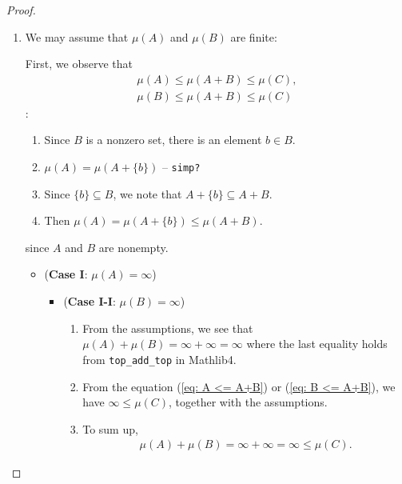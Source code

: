 \begin{proof}
    \begin{enumerate}
        \item We may assume that \(\mu(A)\) and \(\mu(B)\) are finite:

        First, we observe that
        \begin{eqnarray}
            {\mu(A) \leq \mu(A+B)} \leq \mu(C), \label{eq: A <= A+B}\\
            {\mu(B) \leq \mu(A+B)} \leq \mu(C) \label{eq: B <= A+B}
        \end{eqnarray}
        :\begin{enumerate}
            \item Since \(B\) is a nonzero set, there is an element \(b \in B\).
            \item \(\mu(A) =\mu(A+\{b\})\) -- \texttt{simp?}
            \item Since \(\{b\} \subseteq B\), we note that \(A + \{b\} \subseteq A + B\).
            \item Then \(\mu(A) = \mu(A + \{b\}) \leq \mu(A+B)\).
        \end{enumerate}
        since \(A\) and \(B\) are nonempty.
        \begin{itemize}
            \item (\textbf{Case I}: \(\mu(A)=\infty\))
            \begin{itemize}
                \item (\textbf{Case I-I}: \(\mu(B) = \infty\))
                \begin{enumerate}
                    \item From the assumptions, we see that \(\mu(A) + \mu(B) = {\infty + \infty = \infty}\) where the last equality holds from \texttt{top\_add\_top} in Mathlib4.
                    \item From the equation (\ref{eq: A <= A+B}) or (\ref{eq: B <= A+B}), we have \(\infty \leq \mu(C)\), together with the assumptions.
                    \item To sum up,
                    \begin{eqnarray*}
                        \mu(A) + \mu (B) = \infty + \infty = \infty \leq \mu(C).
                    \end{eqnarray*}
                \end{enumerate}


\end{itemize}
\end{itemize}
\end{enumerate}
\end{proof}
